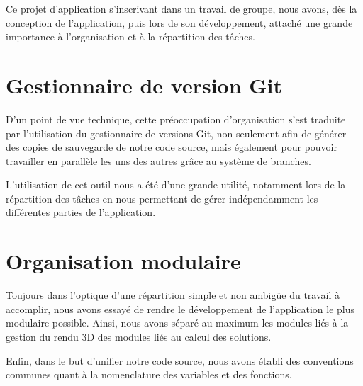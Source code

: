 Ce projet d'application s'inscrivant dans un travail de groupe, nous avons, dès la conception de l'application, puis lors de son développement, attaché une grande importance à l'organisation et à la répartition des tâches.

\section{Gestionnaire de version Git}
D'un point de vue technique, cette préoccupation d'organisation s'est traduite par l'utilisation du gestionnaire de versions Git, non seulement afin de générer des copies de sauvegarde de notre code source, mais également pour pouvoir travailler en parallèle les uns des autres grâce au système de branches.

L'utilisation de cet outil nous a été d'une grande utilité, notamment lors de la répartition des tâches en nous permettant de gérer indépendamment les différentes parties de l'application.

\section{Organisation modulaire}
Toujours dans l'optique d'une répartition simple et non ambigüe du travail à accomplir, nous avons essayé de rendre le développement de l'application le plus modulaire possible. Ainsi, nous avons séparé au maximum les modules liés à la gestion du rendu 3D des modules liés au calcul des solutions.

Enfin, dans le but d'unifier notre code source, nous avons établi des conventions communes quant à la nomenclature des variables et des fonctions.